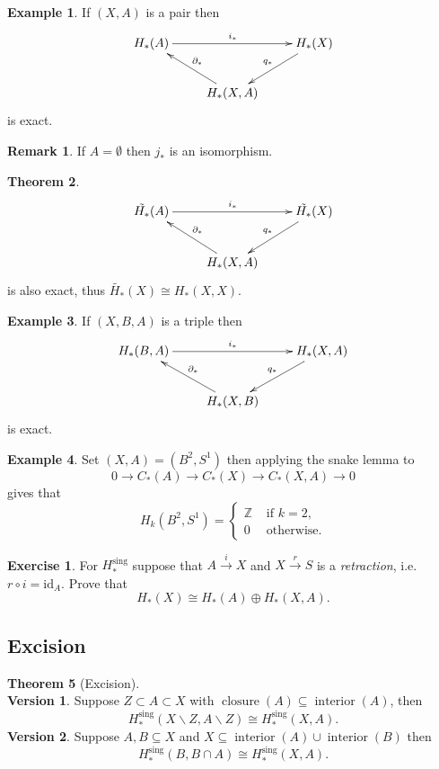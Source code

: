 \documentclass[12pt]{article}
\theoremstyle{definition}
\newtheorem{thm}{Theorem}[subsection]
\theoremstyle{definition}
\newtheorem{ex}[thm]{Example}
\newtheorem*{exer}{Exercise}
\newtheorem*{rmk}{Remark}
\newcommand{\ZZ}{\mathbb{Z}}
\newcommand{\C}{C_*}
\renewcommand{\H}{H_*}
\begin{document}
\begin{ex}
If $(X,A)$ is a pair then 
\[
\xymatrix
{
 \H(A) \ar[rr]^{i_*}& &\H(X)\ar[dl]_{q_*} \\
 &\H(X,A) \ar[ul]_{\partial_*}&
}
\]
is exact.
\end{ex}

\begin{rmk}
If $A = \emptyset$ then $j_*$ is an isomorphism.
\end{rmk}

\begin{thm}
\[
\xymatrix
{
 \tilde{\H}(A) \ar[rr]^{i_*}& &\tilde{\H}(X)\ar[dl]_{q_*} \\
 &\H(X,A) \ar[ul]_{\partial_*}&
}
\]
is also exact, thus $\tilde{\H}(X) \cong \H(X,X)$.
\end{thm}

\begin{ex}
If $(X,B,A)$ is a triple then
\[
\xymatrix
{
 \H(B,A) \ar[rr]^{i_*}& &\H(X,A)\ar[dl]_{q_*} \\
 &\H(X,B) \ar[ul]_{\partial_*}&
}
\]
is exact.
\end{ex}

\begin{ex}
Set $(X,A) = (B^2, S^1)$ then applying the snake lemma to
\[
0 \to \C(A) \to \C(X)\to \C(X,A) \to 0
\]
gives that
\[
H_k(B^2, S^1) =\begin{cases}\ZZ&\text{ if }k=2,\\
0 &\text{ otherwise}.
\end{cases} 
\]
\end{ex}

\begin{exer}
For $\H^\text{sing}$ suppose that $A\xrightarrow{i} X$ and $X\xrightarrow{r} S$ is a \emph{retraction}, i.e. $r\circ i = \mathrm{id}_A$.
Prove that
\[
\H(X) \cong\H(A) \oplus \H(X,A).
\]
\end{exer}

\subsection{Excision}

\begin{thm}[Excision]~\\
\textbf{Version 1}.
Suppose $Z\subset A \subset X$ with $\operatorname{closure}(A) \subseteq \operatorname{interior}(A)$, then
\[
\H^\text{sing}(X\smallsetminus Z, A\smallsetminus Z) \cong \H^\text{sing}(X, A).
\]
\textbf{Version 2}.
Suppose $A,B\subseteq X$ and $X \subseteq \operatorname{interior}(A) \cup \operatorname{interior}(B)$ then 
\[
\H^\text{sing}(B, B\cap A) \cong \H^\text{sing}(X, A).
\]
\end{thm}
\end{document}
